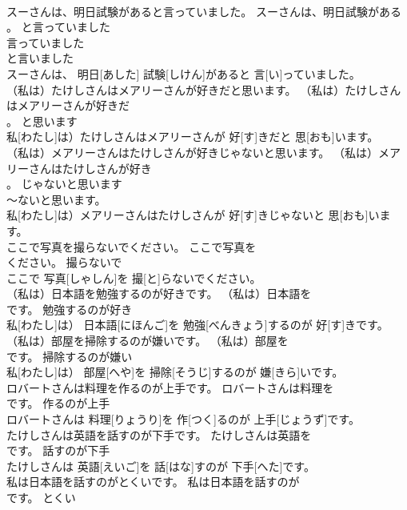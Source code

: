 \documentclass[8pt]{extreport}
\begin{document}
\begin{CJK}{UTF8}{min}
\\	スーさんは、明日試験があると言っていました。	スーさんは、明日試験がある
\\	。	と言っていました	
\\	言っていました 
\\	と言いました 
\\	スーさんは、 明日[あした] 試験[しけん]があると 言[い]っていました。	
\\	（私は）たけしさんはメアリーさんが好きだと思います。	（私は）たけしさんはメアリーさんが好きだ
\\	。	と思います	
\\	私[わたし]は）たけしさんはメアリーさんが 好[す]きだと 思[おも]います。	
\\	（私は）メアリーさんはたけしさんが好きじゃないと思います。	（私は）メアリーさんはたけしさんが好き
\\	。	じゃないと思います	
\\	～ないと思います。	
\\	私[わたし]は）メアリーさんはたけしさんが 好[す]きじゃないと 思[おも]います。	
\\	ここで写真を撮らないでください。	ここで写真を
\\	ください。	撮らないで	
\\	ここで 写真[しゃしん]を 撮[と]らないでください。	
\\	（私は）日本語を勉強するのが好きです。	（私は）日本語を
\\	です。	勉強するのが好き	
\\	私[わたし]は） 日本語[にほんご]を 勉強[べんきょう]するのが 好[す]きです。	
\\	（私は）部屋を掃除するのが嫌いです。	（私は）部屋を
\\	です。	掃除するのが嫌い	
\\	私[わたし]は） 部屋[へや]を 掃除[そうじ]するのが 嫌[きら]いです。	
\\	ロバートさんは料理を作るのが上手です。	ロバートさんは料理を
\\	です。	作るのが上手	
\\	ロバートさんは 料理[りょうり]を 作[つく]るのが 上手[じょうず]です。	
\\	たけしさんは英語を話すのが下手です。	たけしさんは英語を
\\	です。	話すのが下手	
\\	たけしさんは 英語[えいご]を 話[はな]すのが 下手[へた]です。	
\\	私は日本語を話すのがとくいです。	私は日本語を話すのが
\\	です。	とくい	

\end{CJK}
\end{document}
